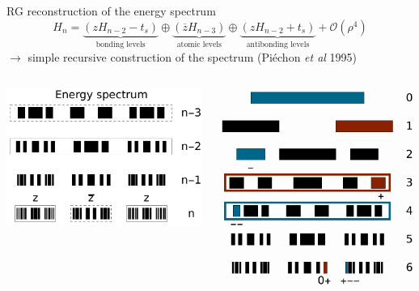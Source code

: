 \documentclass[xcolor=x11names,compress,professionalfonts]{beamer}
\renewcommand{\(}{\begin{columns}}
\renewcommand{\)}{\end{columns}}
\newcommand{\<}[1]{\begin{column}{#1}}
\renewcommand{\>}{\end{column}}
\newcommand{\zb}{\ensuremath{\overline{z}}}
\begin{document}
\begin{frame}{RG reconstruction of the energy spectrum}
 \[ H_n = \underbrace{\left( z H_{n-2} - t_s \right)}_{\text{bonding levels}} \oplus \underbrace{\left( \zb H_{n-3} \right)}_{\text{atomic levels}} \oplus \underbrace{\left( z H_{n-2} + t_s \right)}_{\text{antibonding levels}} + \mathcal{O}(\rho^4)\]
	$\rightarrow$ simple recursive construction of the spectrum (Piéchon \emph{et al} 1995)
	
	\begin{columns}
	\begin{column}{6cm}
	\centering
	\includegraphics[scale=.4]{recursive_construction_spectrum.pdf}
	\end{column}
	\begin{column}{6cm}
	\includegraphics[scale=.35]{renormalization_paths_spectrum.pdf}

\end{column}
\end{columns}
\end{frame}
\end{document}
